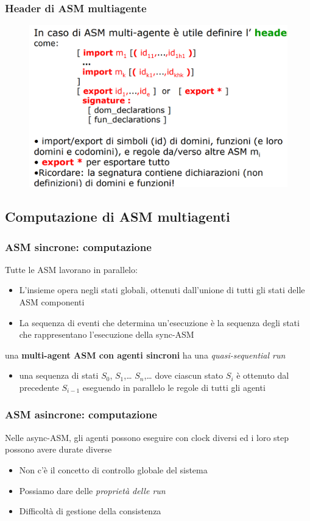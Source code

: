 \subsubsection{Header di ASM multiagente}
\begin{figure}[H]
    \includegraphics[width=0.8\linewidth]{chapters/3/immaginette/HeaderMultiA.png}
\end{figure}

\subsection{Computazione di ASM multiagenti}
\subsubsection{ASM sincrone: computazione}
\noindent Tutte le ASM lavorano in parallelo:
\begin{itemize}
    \item L'insieme opera negli stati globali, ottenuti dall'unione di tutti gli stati delle ASM componenti
    \item La sequenza di eventi che determina un'esecuzione è la sequenza degli stati che rappresentano l'esecuzione della sync-ASM
\end{itemize}
\noindent una \textbf{multi-agent ASM con agenti sincroni} ha una \textit{quasi-sequential run}
\begin{itemize}
    \item una sequenza di stati $S_0$, $S_1$,… $S_n$,… dove ciascun stato $S_i$ è ottenuto dal precedente $S_{i-1}$ eseguendo in parallelo le regole di tutti gli agenti
\end{itemize}

\subsubsection{ASM asincrone: computazione}
\noindent Nelle async-ASM, gli agenti possono eseguire con clock diversi ed i loro step
possono avere durate diverse
\begin{itemize}
    \item Non c'è il concetto di controllo globale del sistema
    \item Possiamo dare delle \textit{proprietà delle run}
    \item Difficoltà di gestione della consistenza
\end{itemize}

